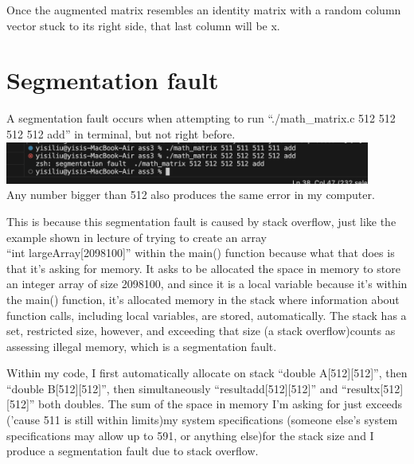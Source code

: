 \documentclass{article}
\begin{document}
Once the augmented matrix resembles an identity matrix with a random column vector stuck to its right side, that last column will be x.

\section{Segmentation fault}

A segmentation fault occurs when attempting to run ``./math\_matrix.c 512 512 512 512 add'' in terminal, but not right before.
\\

\includegraphics[width = 12cm]{terminal.png}
\\

Any number bigger than 512 also produces the same error in my computer. 

This is because this segmentation fault is caused by stack overflow, just like the example shown in lecture of trying to create an array \\``int largeArray[2098100]'' within the main() function because what that does is that it's asking for memory. It asks to be allocated the space in memory to store an integer array of size 2098100, and since it is a local variable because it's within the main() function, it's allocated memory in the stack where information about function calls, including local variables, are stored, automatically. The stack has a set, restricted size, however, and exceeding that size (a stack overflow)counts as assessing illegal memory, which is a segmentation fault. 

Within my code, I first automatically allocate on stack ``double A[512][512]'', then ``double B[512][512]'', then simultaneously ``resultadd[512][512]'' and ``resultx[512][512]'' both doubles. The sum of the space in memory I'm asking for just exceeds ('cause 511 is still within limits)my system specifications (someone else's system specifications may allow up to 591, or anything else)for the stack size and I produce a segmentation fault due to stack overflow. 
\end{document}
